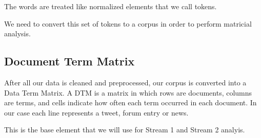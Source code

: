 The words are treated like normalized elements that we call tokens.

We need to convert this set of tokens to a corpus in order to perform matricial analysis.

\subsection{Document Term Matrix}
\label{subsec:DTM}

After all our data is cleaned and preprocessed, our corpus is converted into a Data Term Matrix. A DTM is a matrix in which rows are documents, columns are terms, and cells indicate how often each term occurred in each document. In our case each line represents a tweet, forum entry or news.

This is the base element that we will use for Stream 1 and Stream 2 analyis.
